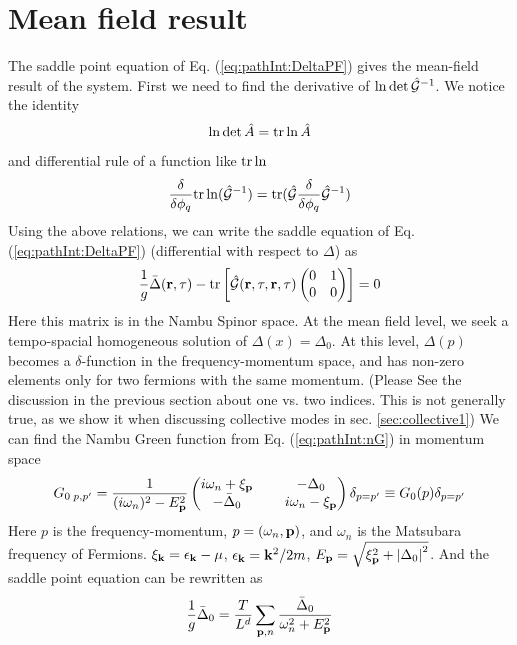 \section{Mean field result\label{sec:pathInt:meanfield}}
The saddle point equation of Eq. (\ref{eq:pathInt:DeltaPF}) gives the mean-field result of the system.  First we need to find the derivative of $\ln\det\hat{\mathcal{G}}^{-1}$.  We notice the identity
\begin{equation}
\ln\det\hat{A}=\text{tr}\ln\hat{A}
\end{equation}
and differential rule of a function like $\text{tr}\ln$
\begin{equation}\label{eq:pathInt:diffTr}
\frac{\delta}{\delta\phi_q}\text{tr}\ln(\hat{\mathcal{G}}^{-1})=\text{tr}(\hat{\mathcal{G}}\frac{\delta}{\delta\phi_q}\hat{\mathcal{G}}^{-1})
\end{equation}
Using the above relations, we can write the saddle equation of Eq. (\ref{eq:pathInt:DeltaPF}) (differential with respect to $\Delta$) as
\begin{equation}
\frac{1}{g}\bar{\Delta}(\mathbf{r},\tau)-\text{tr}\left[\hat{\mathcal{G}}(\mathbf{r},\tau,\mathbf{r},\tau)\begin{pmatrix}0&1\\0&0\end{pmatrix}\right]=0
\end{equation}
Here this matrix is in the Nambu Spinor space.  At the  mean field level, we seek a tempo-spacial homogeneous solution of $\Delta(x)=\Delta_{0}$.  At this level,  $\Delta(p)$ becomes a $\delta$-function in the frequency-momentum space, and has non-zero elements only for two fermions with the same momentum.  (Please See the discussion in the previous section about one vs. two indices. This is not generally true, as we show it when discussing collective modes in sec. \ref{sec:collective1})
We can find the Nambu Green function from Eq. (\ref{eq:pathInt:nG}) in momentum space
\begin{equation}\label{eq:pathInt:G0}
G_{0\;p,p'}=\frac{1}{(i\omega_n)^2-E_{\mathbf{p}}^2}
\begin{pmatrix}
	i\omega_n+\xi_{\mathbf{p}}&\;&-\Delta_0\\
	-\bar{\Delta}_0&\;&i\omega_n-\xi_{\mathbf{p}}
\end{pmatrix}
\delta_{p=p'}
\equiv{}G_{0}(p)\delta_{p=p'}
\end{equation}
Here $p$ is the frequency-momentum, $p=(\omega_{n},\mathbf{p})$, and $\omega_n$ is the Matsubara frequency of Fermions.  $\xi_{\mathbf{k}}=\epsilon_{\mathbf{k}}-\mu$, $\epsilon_{\mathbf{k}}=\mathbf{k}^{2}/2m$,  $E_{\mathbf{p}}=\sqrt{\xi_{\mathbf{p}}^2+\left\lvert{\Delta_0}\right\rvert^2}$.  And the saddle point equation can be rewritten as 
\begin{equation}
\frac{1}{g}\bar{\Delta}_0=\frac{T}{L^d}\sum_{\mathbf{p},n}\frac{\bar\Delta_0}{\omega_n^2+E_{\mathbf{p}}^2}
\end{equation}
